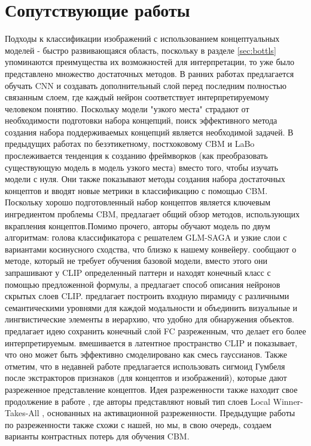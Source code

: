 \section{Сопутствующие работы}
\label{sec:relwork}

Подходы к классификации изображений с использованием концептуальных моделей - быстро развивающаяся область, поскольку в разделе \ref{sec:bottls} упоминаются преимущества их возможностей для интерпретации, то уже было представлено множество достаточных методов. В ранних работах \cite{koh2020concept,losch2019interpretability,Marcos_2020_ACCV} предлагается обучать CNN \cite{5537907} и создавать дополнительный слой перед последним полностью связанным слоем, где каждый нейрон соответствует интерпретируемому человеком понятию. Поскольку модели "узкого места" страдают от необходимости подготовки набора концепций, поиск эффективного метода создания набора поддерживаемых концепций является необходимой задачей. В предыдущих работах по безэтикетному, постхоковому CBM и LaBo \cite{oikarinen2023labelfree,yuksekgonul2023posthoc,yang2023language} прослеживается тенденция к созданию фреймворков (как преобразовать существующую модель в модель узкого места) вместо того, чтобы изучать модели с нуля. Они также показывают методы создания набора достаточных концептов и вводят новые метрики в классификацию с помощью CBM. Поскольку хорошо подготовленный набор концептов является ключевым ингредиентом проблемы CBM, \cite{schwalbe2022concept} предлагает общий обзор методов, использующих вкрапления концептов.Помимо прочего, авторы \cite{oikarinen2023labelfree} обучают модель по двум алгоритмам: голова классификатора с решателем GLM-SAGA \cite{pmlr-v139-wong21b} и узкие слои с вариантами косинусного сходства, что близко к нашему конвейеру. \cite{menon2022visual} сообщают о методе, который не требует обучения базовой модели, вместо этого они запрашивают у CLIP определенный паттерн и находят конечный класс с помощью предложенной формулы, а \cite{oikarinen2023clipdissect} предлагает способ описания нейронов скрытых слоев CLIP. \cite{gao2022pyramidclip} предлагает построить входную пирамиду с различными семантическими уровнями для каждой модальности и объединить визуальные и лингвистические элементы в иерархию, что удобно для обнаружения объектов. \cite{pmlr-v139-wong21b} предлагает идею сохранить конечный слой FC разреженным, что делает его более интерпретируемым. \cite{kazmierczak2023clipqda} вмешивается в латентное пространство CLIP и показывает, что оно может быть эффективно смоделировано как смесь гауссианов. Также отметим, что в недавней работе \cite{Alukaev_2023} предлагается использовать сигмоид Гумбеля после экстракторов признаков (для концептов и изображений), которые дают разреженное представление концептов. Идея разреженности также находит свое продолжение в работе \cite{panousis2023discover}, где авторы представляют новый тип слоев Local Winner-Takes-All \cite{panousis2019nonparametric}, основанных на активационной разреженности. Предыдущие работы по разреженности также схожи с нашей, но мы, в свою очередь, создаем варианты контрастных потерь для обучения CBM.

